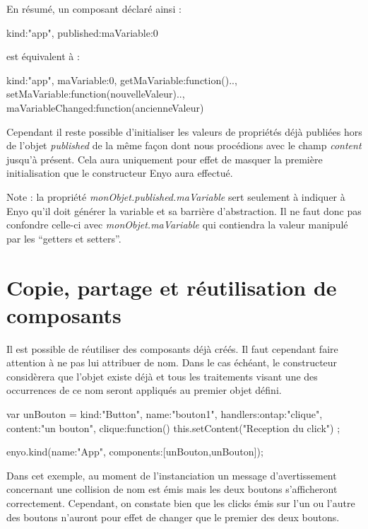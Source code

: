 \documentclass[11pt,a4paper]{report}
\begin{document}
En résumé, un composant déclaré ainsi : 
\begin{JavaScript}
  {kind:"app", published:{maVariable:0}}
\end{JavaScript}
est équivalent à :
\begin{JavaScript}
  {kind:"app", maVariable:0, 
    getMaVariable:function(){..}, 
    setMaVariable:function(nouvelleValeur){..}, 
    maVariableChanged:function(ancienneValeur){}}
\end{JavaScript}


Cependant il reste possible d'initialiser les valeurs de propriétés 
déjà publiées hors de l'objet \emph{published} de la même façon dont nous procédions 
avec le champ \emph{content} jusqu'à présent. Cela aura uniquement pour effet de  masquer la première 
initialisation que le constructeur Enyo aura effectué.

Note : la propriété \emph{monObjet.published.maVariable} sert seulement à indiquer à Enyo 
qu'il doit générer la variable et sa barrière d'abstraction.
Il ne faut donc pas confondre celle-ci avec \emph{monObjet.maVariable} qui contiendra
la valeur manipulé par les ``getters et setters''.

\section{Copie, partage et réutilisation de composants}

Il est possible de réutiliser des composants déjà créés. Il faut cependant faire attention à ne pas
lui attribuer de nom. Dans le cas échéant, le constructeur considèrera que l'objet existe déjà et 
tous les traitements visant une des occurrences de ce nom seront appliqués au premier objet défini.

\begin{JavaScript}
var unBouton = {kind:"Button", name:"bouton1", 
                handlers:{ontap:"clique"}, 
                content:"un bouton",
                clique:function(){
                  this.setContent("Reception du click")
                }
};

enyo.kind({name:"App", components:[unBouton,unBouton]});
\end{JavaScript}

Dans cet exemple, au moment de l'instanciation un message d'avertissement concernant une collision de nom 
est émis mais les deux boutons s'afficheront correctement. Cependant, on constate bien que les clicks 
émis sur l'un ou l'autre des boutons n'auront pour effet de changer que le premier des deux boutons.\\\medskip
\end{document}

